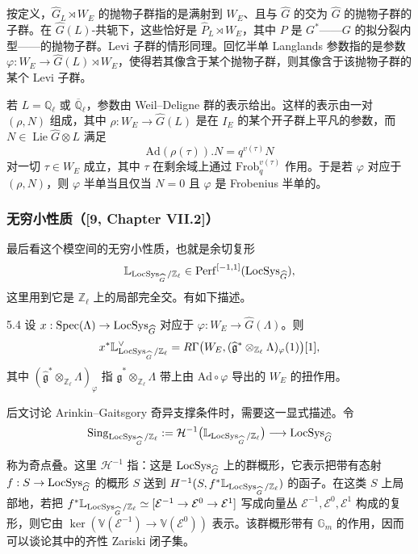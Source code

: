 按定义，$\widehat{G}_{L}\rtimes W_{E}$ 的抛物子群指的是满射到 $W_{E}$、且与 $\widehat{G}$ 的交为 $\widehat{G}$ 的抛物子群的子群。在 $\widehat{G}(L)$-共轭下，这些恰好是 $\widehat{P}_{L}\rtimes W_{E}$，其中 $P$ 是 $G^{*}$——$G$ 的拟分裂内型——的抛物子群。Levi 子群的情形同理。回忆半单 Langlands 参数指的是参数 $\varphi:W_{E}\to\widehat{G}(L)\rtimes W_{E}$，使得若其像含于某个抛物子群，则其像含于该抛物子群的某个 Levi 子群。

若 $L=\mathbb{Q}_{\ell}$ 或 $\overline{\mathbb{Q}}_{\ell}$，参数由 Weil–Deligne 群的表示给出。这样的表示由一对 $(\rho,N)$ 组成，其中 $\rho:W_{E}\to\widehat{G}(L)$ 是在 $I_{E}$ 的某个开子群上平凡的参数，而 $N\in\operatorname{Lie}\widehat{G}\otimes L$ 满足
\[
\mathrm{Ad}(\rho(\tau)).N=q^{v(\tau)}N
\]
对一切 $\tau\in W_{E}$ 成立，其中 $\tau$ 在剩余域上通过 $\mathrm{Frob}_{q}^{v(\tau)}$ 作用。于是若 $\varphi$ 对应于 $(\rho,N)$，则 $\varphi$ 半单当且仅当 $N=0$ 且 $\varphi$ 是 Frobenius 半单的。

\subsubsection{无穷小性质（[9, Chapter VII.2]）}
最后看这个模空间的无穷小性质，也就是余切复形
\[
\mathbb{L}_{\operatorname{LocSys}_{\widehat{G}}/\mathbb{Z}_{\ell}}\in\operatorname{Perf}^{[-1,1]}(\operatorname{LocSys}_{\widehat{G}}),
\]
这里用到它是 $\mathbb{Z}_{\ell}$ 上的局部完全交。有如下描述。

\begin{thm}{5.4}
设 $x:\operatorname{Spec}(\Lambda)\to\operatorname{LocSys}_{\widehat{G}}$ 对应于 $\varphi:W_{E}\to\widehat{G}(\Lambda)$。则
\[
x^{*}\mathbb{L}^{\vee}_{\operatorname{LocSys}_{\widehat{G}}/\mathbb{Z}_{\ell}}=R\Gamma\bigl(W_{E},(\widehat{\mathfrak{g}}^{*}\otimes_{\mathbb{Z}_{\ell}}\Lambda)_{\varphi}(1)\bigr)[1],
\]
其中 $(\widehat{\mathfrak{g}}^{*}\otimes_{\mathbb{Z}_{\ell}}\Lambda)_{\varphi}$ 指 $\widehat{\mathfrak{g}}^{*}\otimes_{\mathbb{Z}_{\ell}}\Lambda$ 带上由 $\mathrm{Ad}\circ\varphi$ 导出的 $W_{E}$ 的扭作用。
\label{thm:a3-5-4}
\end{thm}

后文讨论 Arinkin–Gaitsgory 奇异支撑条件时，需要这一显式描述。令
\[
\operatorname{Sing}_{\operatorname{LocSys}_{\widehat{G}}/\mathbb{Z}_{\ell}}:=\mathcal{H}^{-1}\bigl(\mathbb{L}_{\operatorname{LocSys}_{\widehat{G}}/\mathbb{Z}_{\ell}}\bigr)\longrightarrow\operatorname{LocSys}_{\widehat{G}}
\]

称为奇点叠。这里 $\mathcal{H}^{-1}$ 指：这是 $\operatorname{LocSys}_{\widehat{G}}$ 上的群概形，它表示把带有态射 $f:S\to\operatorname{LocSys}_{\widehat{G}}$ 的概形 $S$ 送到 $H^{-1}(S,f^{*}\mathbb{L}_{\operatorname{LocSys}_{\widehat{G}}/\mathbb{Z}_{\ell}})$ 的函子。在这类 $S$ 上局部地，若把 $f^{*}\mathbb{L}_{\operatorname{LocSys}_{\widehat{G}}/\mathbb{Z}_{\ell}}\simeq[\mathcal{E}^{-1}\to\mathcal{E}^{0}\to\mathcal{E}^{1}]$ 写成向量丛 $\mathcal{E}^{-1},\mathcal{E}^{0},\mathcal{E}^{1}$ 构成的复形，则它由 $\ker(\mathbb{V}(\mathcal{E}^{-1})\to\mathbb{V}(\mathcal{E}^{0}))$ 表示。该群概形带有 $\mathbb{G}_{m}$ 的作用，因而可以谈论其中的齐性 Zariski 闭子集。

